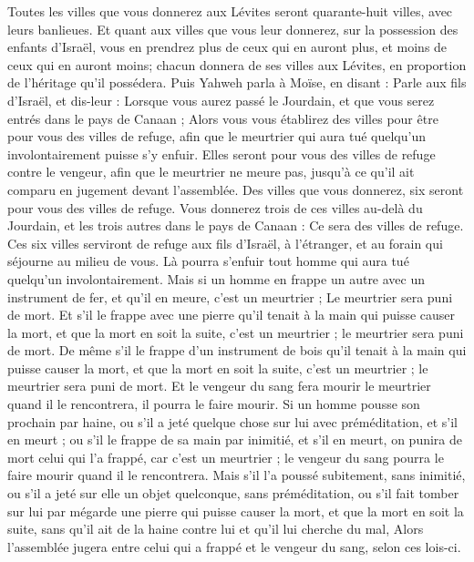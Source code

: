 \begin{multicols}{2}
Toutes les villes que vous donnerez aux Lévites seront quarante-huit villes, avec leurs banlieues.
Et quant aux villes que vous leur donnerez, sur la possession des enfants d'Israël, vous en prendrez plus de ceux qui en auront plus, et moins de ceux qui en auront moins; chacun donnera de ses villes aux Lévites, en proportion de l'héritage qu'il possédera.
Puis Yahweh parla à Moïse, en disant :
Parle aux fils d'Israël, et dis-leur : Lorsque vous aurez passé le Jourdain, et que vous serez entrés dans le pays de Canaan ;
Alors vous vous établirez des villes pour être pour vous des villes de refuge, afin que le meurtrier qui aura tué quelqu’un involontairement puisse s’y enfuir.
Elles seront pour vous des villes de refuge contre le vengeur, afin que le meurtrier ne meure pas, jusqu’à ce qu’il ait comparu en jugement devant l’assemblée.
Des villes que vous donnerez, six seront pour vous des villes de refuge.
Vous donnerez trois de ces villes au-delà du Jourdain, et les trois autres dans le pays de Canaan : Ce sera des villes de refuge.
Ces six villes serviront de refuge aux fils d'Israël, à l'étranger, et au forain qui séjourne au milieu de vous. Là pourra s’enfuir tout homme qui aura tué quelqu’un involontairement.
Mais si un homme en frappe un autre avec un instrument de fer, et qu'il en meure, c’est un meurtrier ; Le meurtrier sera puni de mort.
Et s’il le frappe avec une pierre qu’il tenait à la main qui puisse causer la mort, et que la mort en soit la suite, c'est un meurtrier ; le meurtrier sera puni de mort.
De même s’il le frappe d’un instrument de bois qu’il tenait à la main qui puisse causer la mort, et que la mort en soit la suite, c'est un meurtrier ; le meurtrier sera puni de mort.
Et le vengeur du sang fera mourir le meurtrier quand il le rencontrera, il pourra le faire mourir.
Si un homme pousse son prochain par haine, ou s'il a jeté quelque chose sur lui avec préméditation, et s'il en meurt ;
ou s’il le frappe de sa main par inimitié, et s'il en meurt, on punira de mort celui qui l'a frappé, car c’est un meurtrier ; le vengeur du sang pourra le faire mourir quand il le rencontrera.
Mais s'il l'a poussé subitement, sans inimitié, ou s'il a jeté sur elle un objet quelconque, sans préméditation,
ou s’il fait tomber sur lui par mégarde une pierre qui puisse causer la mort, et que la mort en soit la suite, sans qu'il ait de la haine contre lui et qu’il lui cherche du mal,
Alors l'assemblée jugera entre celui qui a frappé et le vengeur du sang, selon ces lois-ci.

\end{multicols}
